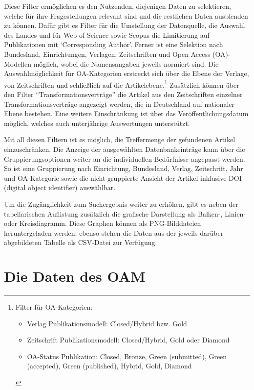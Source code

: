 \documentclass[a4paper,
fontsize=11pt,
oneside,
numbers=noperiodatend,
parskip=half-,
bibliography=totoc,
final
]{scrartcl}
\begin{document}
Diese Filter ermöglichen es den Nutzenden, diejenigen Daten zu
selektieren, welche für ihre Fragestellungen  relevant sind und die
restlichen Daten ausblenden zu können. Dafür gibt es Filter für die
Umstellung der Datenquelle, die Auswahl des Landes und für Web of
Science sowie Scopus die Limitierung auf Publikationen mit
\enquote*{Corresponding Author}. Ferner ist eine Selektion nach
Bundesland, Einrichtungen, Verlagen, Zeitschriften und Open Access
(OA)-Modellen möglich, wobei die Namensangaben jeweils normiert sind.
Die Auswahlmöglichkeit für OA-Kategorien erstreckt sich über die Ebene
der Verlage, von Zeitschriften und schließlich auf die
Artikelebene.\footnote{Filter für OA-Kategorien: 
\begin{itemize} 
\item Verlag Publikationsmodell: Closed/Hybrid bzw. Gold 
\item Zeitschrift Publikationsmodell: Closed/Hybrid, Gold oder Diamond 
\item OA-Status Publikation: Closed, Bronze, Green (submitted), Green (accepted), Green (published), Hybrid, Gold, Diamond 
\end{itemize}} 
Zusätzlich können über den
Filter \enquote{Transformationsverträge} die Artikel aus den
Zeitschriften einzelner Transformationsverträge angezeigt werden, die in
Deutschland auf nationaler Ebene bestehen. Eine weitere Einschränkung
ist über das Veröffentlichungsdatum möglich, welches auch unterjährige
Auswertungen unterstützt.

Mit all diesen Filtern ist es möglich, die Treffermenge der gefundenen
Artikel einzuschränken. Die Anzeige der ausgewählten Datenbankeinträge
kann über die Gruppierungsoptionen weiter an die individuellen
Bedürfnisse angepasst werden. So ist eine Gruppierung nach Einrichtung,
Bundesland, Verlag, Zeitschrift, Jahr und OA-Kategorie sowie die
nicht-gruppierte Ansicht der Artikel inklusive DOI (digital object
identifier) auswählbar.

Um die Zugänglichkeit zum Suchergebnis weiter zu erhöhen, gibt es neben
der tabellarischen Auflistung zusätzlich die grafische Darstellung als
Balken-, Linien- oder Kreisdiagramm. Diese Graphen können als
PNG-Bilddateien heruntergeladen werden; ebenso stehen die Daten aus der
jeweils darüber abgebildeten Tabelle als CSV-Datei zur Verfügung.

\hypertarget{die-daten-des-oam}{%
\section{Die Daten des OAM}\label{die-daten-des-oam}}
\end{document}
